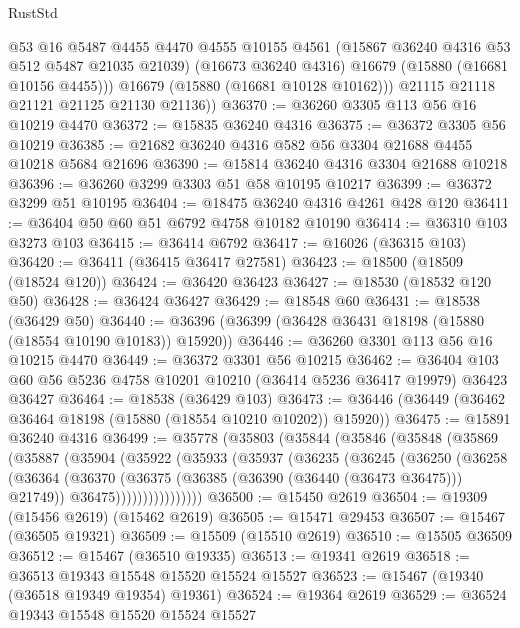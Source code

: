 \begin{lexlean}{RustStd}
\begin{coremodule}
            @53
            @16
            @5487
            @4455
            @4470
            @4555
            @10155
            @4561
            (@15867 @36240 @4316 @53 @512 @5487 @21035 @21039)
            (@16673 @36240 @4316)
            @16679
            (@15880 (@16681 @10156 @4455)))
          @16679
          (@15880 (@16681 @10128 @10162)))
        @21115
        @21118
        @21121
        @21125
        @21130
        @21136))
@36370 := @36260 @3305 @113 @56 @16 @10219 @4470
@36372 := @15835 @36240 @4316
@36375 := @36372 @3305 @56 @10219
@36385 := @21682 @36240 @4316 @582 @56 @3304 @21688 @4455 @10218 @5684 @21696
@36390 := @15814 @36240 @4316 @3304 @21688 @10218
@36396 := @36260 @3299 @3303 @51 @58 @10195 @10217
@36399 := @36372 @3299 @51 @10195
@36404 := @18475 @36240 @4316 @4261 @428 @120
@36411 := @36404 @50 @60 @51 @6792 @4758 @10182 @10190
@36414 := @36310 @103 @3273 @103
@36415 := @36414 @6792
@36417 := @16026 (@36315 @103)
@36420 := @36411 (@36415 @36417 @27581)
@36423 := @18500 (@18509 (@18524 @120))
@36424 := @36420 @36423
@36427 := @18530 (@18532 @120 @50)
@36428 := @36424 @36427
@36429 := @18548 @60
@36431 := @18538 (@36429 @50)
@36440 := @36396 (@36399 (@36428 @36431 @18198 (@15880 (@18554 @10190 @10183)) @15920))
@36446 := @36260 @3301 @113 @56 @16 @10215 @4470
@36449 := @36372 @3301 @56 @10215
@36462 := @36404 @103 @60 @56 @5236 @4758 @10201 @10210 (@36414 @5236 @36417 @19979) @36423 @36427
@36464 := @18538 (@36429 @103)
@36473 := @36446 (@36449 (@36462 @36464 @18198 (@15880 (@18554 @10210 @10202)) @15920))
@36475 := @15891 @36240 @4316
@36499 := @35778
    (@35803
      (@35844
        (@35846
          (@35848
            (@35869
              (@35887
                (@35904
                  (@35922
                    (@35933
                      (@35937
                        (@36235
                          (@36245
                            (@36250
                              (@36258
                                (@36364
                                  (@36370
                                    (@36375 (@36385 (@36390 (@36440 (@36473 @36475))) @21749))
                                    @36475))))))))))))))))
@36500 := @15450 @2619
@36504 := @19309 (@15456 @2619) (@15462 @2619)
@36505 := @15471 @29453
@36507 := @15467 (@36505 @19321)
@36509 := @15509 (@15510 @2619)
@36510 := @15505 @36509
@36512 := @15467 (@36510 @19335)
@36513 := @19341 @2619
@36518 := @36513 @19343 @15548 @15520 @15524 @15527
@36523 := @15467 (@19340 (@36518 @19349 @19354) @19361)
@36524 := @19364 @2619
@36529 := @36524 @19343 @15548 @15520 @15524 @15527

\end{coremodule}
\end{lexlean}
